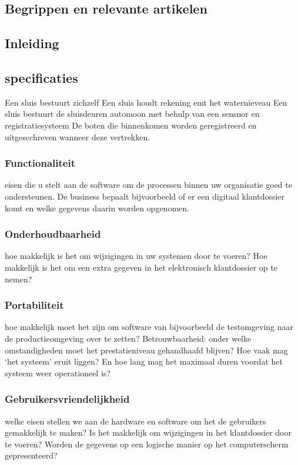 \documentclass{article}
\begin{document}
\subsection{Begrippen en relevante artikelen}

\subsection{Inleiding}
\subsection{specificaties}
Een sluis bestuurt zichzelf
Een sluis houdt rekening emt het waternieveau
Een sluis bestuurt de sluisdeuren automoon met behulp van een sensnor en registratiesysteem
De boten die binnenkomen worden geregistreerd en uitgescchreven wanneer deze vertrekken.

\subsubsection{Functionaliteit} eisen die u stelt aan de software om de processen binnen uw organisatie goed te ondersteunen. De business bepaalt bijvoorbeeld of er een digitaal klantdossier komt en welke gegevens daarin worden opgenomen.
\subsubsection{Onderhoudbaarheid} hoe makkelijk is het om wijzigingen in uw systemen door te voeren? Hoe makkelijk is het om een extra gegeven in het elektronisch klantdossier op te nemen?
\subsubsection{Portabiliteit} hoe makkelijk moet het zijn om software van bijvoorbeeld de testomgeving naar de productieomgeving over te zetten?
Betrouwbaarheid: onder welke omstandigheden moet het prestatieniveau gehandhaafd blijven? Hoe vaak mag ‘het systeem’ eruit liggen? En hoe lang mag het maximaal duren voordat het systeem weer operationeel is?
\subsubsection{Gebruikersvriendelijkheid} welke eisen stellen we aan de hardware en software om het de gebruikers gemakkelijk te maken? Is het makkelijk om wijzigingen in het klantdossier door te voeren? Worden de gegevens op een logische manier op het computerscherm gepresenteerd?
\end{document}
